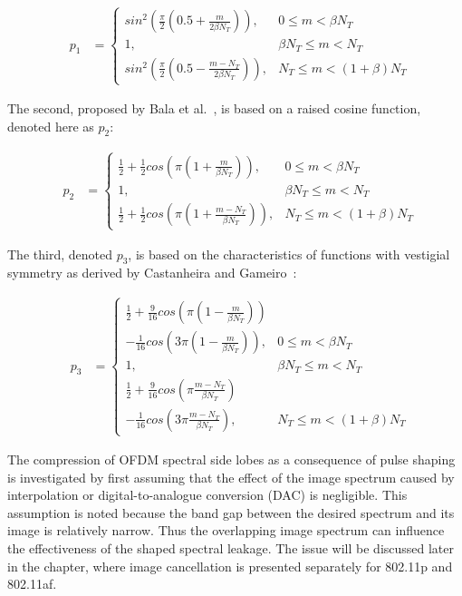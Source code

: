 \begin{eqnarray}
\label{p1m}
&p_1 &=\begin{cases}	sin^2( \frac{\pi}{2}(0.5+\frac{m}{2\beta N_{T}}) ), 			& 0 \leq m < \beta N_{T} \\
					 	1, 															& \beta N_{T} \leq m < N_{T}  \\
					 	sin^2( \frac{\pi}{2}(0.5-\frac{m-N_{T}}{2\beta N_{T}}) ), 	& N_{T} \leq m < (1+\beta)N_{T} \end{cases}
\end{eqnarray}

The second, proposed by Bala et al.~\cite{Bala2013}, is based on a raised cosine function, denoted here as $p_2$:

\begin{eqnarray}
\label{p2m}
&p_2 &=\begin{cases}	\frac{1}{2}+\frac{1}{2}cos(\pi(1+\frac{m}{\beta N_{T}})), 			&0\leq m<\beta N_{T} \\
					 	1, 																	&\beta N_{T}\leq m < N_{T}  \\
					 	\frac{1}{2}+\frac{1}{2}cos(\pi(1+\frac{m-N_{T}}{\beta N_{T}})),		& N_{T}\leq m<(1+\beta)N_{T} \end{cases}
\end{eqnarray}

The third, denoted $p_3$, is based on the characteristics of functions with vestigial symmetry as derived by Castanheira and Gameiro~\cite{Castanheira2013}:

\begin{eqnarray}
\label{p3m}
&p_3 &=\begin{cases}	\frac{1}{2}+\frac{9}{16}cos( \pi(1 - \frac{m}{\beta N_{T}}) ) & \\
						- \frac{1}{16}cos(3\pi(1 - \frac{m}{\beta N_{T}}) ), 					& 0 \leq m < \beta N_{T} \\
					 	1, 																	& \beta N_{T} \leq m < N_{T}  \\
					 	\frac{1}{2}+\frac{9}{16}cos( \pi \frac{m-N_{T}}{\beta N_{T}}) &\\
						-\frac{1}{16}cos(3\pi \frac{m-N_{T}}{\beta N_{T}}),					&  N_{T} \leq m < (1+\beta)N_{T} \end{cases}
\end{eqnarray}

The compression of OFDM spectral side lobes as a consequence of pulse shaping is investigated by first assuming that the effect of the image spectrum caused by interpolation or digital-to-analogue conversion (DAC) is negligible.
This assumption is noted because the band gap between the desired spectrum and its image is relatively narrow.
Thus the overlapping image spectrum can influence the effectiveness of the shaped spectral leakage.
The issue will be discussed later in the chapter, where image cancellation is presented separately for 802.11p and 802.11af.

